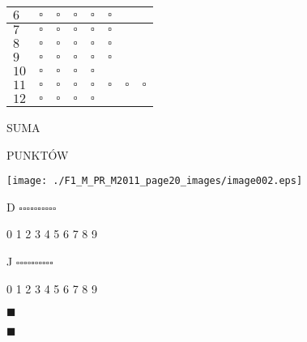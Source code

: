 \documentclass[a4paper,12pt]{article}
\begin{document}
\begin{center}
\begin{tabular}{|l|l|l|l|l|l|l|l|}
\hline
\multicolumn{1}{|l|}{ $6$}&	\multicolumn{1}{|l|}{ $\square $}&	\multicolumn{1}{|l|}{ $\square $}&	\multicolumn{1}{|l|}{ $\square $}&	\multicolumn{1}{|l|}{ $\square $}&	\multicolumn{1}{|l|}{ $\square $}&	\multicolumn{1}{|l|}{}&	\multicolumn{1}{|l|}{}	\\
\hline
\multicolumn{1}{|l|}{ $7$}&	\multicolumn{1}{|l|}{ $\square $}&	\multicolumn{1}{|l|}{ $\square $}&	\multicolumn{1}{|l|}{ $\square $}&	\multicolumn{1}{|l|}{ $\square $}&	\multicolumn{1}{|l|}{ $\square $}&	\multicolumn{1}{|l|}{}&	\multicolumn{1}{|l|}{}	\\
\hline
\multicolumn{1}{|l|}{ $8$}&	\multicolumn{1}{|l|}{ $\square $}&	\multicolumn{1}{|l|}{ $\square $}&	\multicolumn{1}{|l|}{ $\square $}&	\multicolumn{1}{|l|}{ $\square $}&	\multicolumn{1}{|l|}{ $\square $}&	\multicolumn{1}{|l|}{}&	\multicolumn{1}{|l|}{}	\\
\hline
\multicolumn{1}{|l|}{ $9$}&	\multicolumn{1}{|l|}{ $\square $}&	\multicolumn{1}{|l|}{ $\square $}&	\multicolumn{1}{|l|}{ $\square $}&	\multicolumn{1}{|l|}{ $\square $}&	\multicolumn{1}{|l|}{ $\square $}&	\multicolumn{1}{|l|}{}&	\multicolumn{1}{|l|}{}	\\
\hline
\multicolumn{1}{|l|}{ $10$}&	\multicolumn{1}{|l|}{ $\square $}&	\multicolumn{1}{|l|}{ $\square $}&	\multicolumn{1}{|l|}{ $\square $}&	\multicolumn{1}{|l|}{ $\square $}&	\multicolumn{1}{|l|}{}&	\multicolumn{1}{|l|}{}&	\multicolumn{1}{|l|}{}	\\
\hline
\multicolumn{1}{|l|}{ $11$}&	\multicolumn{1}{|l|}{ $\square $}&	\multicolumn{1}{|l|}{ $\square $}&	\multicolumn{1}{|l|}{ $\square $}&	\multicolumn{1}{|l|}{ $\square $}&	\multicolumn{1}{|l|}{ $\square $}&	\multicolumn{1}{|l|}{ $\square $}&	\multicolumn{1}{|l|}{ $\square $}	\\
\hline
\multicolumn{1}{|l|}{ $12$}&	\multicolumn{1}{|l|}{ $\square $}&	\multicolumn{1}{|l|}{ $\square $}&	\multicolumn{1}{|l|}{ $\square $}&	\multicolumn{1}{|l|}{ $\square $}&	\multicolumn{1}{|l|}{}&	\multicolumn{1}{|l|}{}&	\multicolumn{1}{|l|}{}	\\
\hline
\end{tabular}

\end{center}
SUMA

PUNKTÓW
\begin{center}
\texttt{[image: ./F1\_M\_PR\_M2011\_page20\_images/image002.eps]}
\end{center}
D $\square  \square  \square  \square  \square  \square  \square  \square  \square  \square $

0 1 2 3 4 5 6 7 8 9

J $\square  \square  \square  \square  \square  \square  \square  \square  \square  \square $

0 1 2 3 4 5 6 7 8 9

$\blacksquare$

$\blacksquare$
\end{document}
